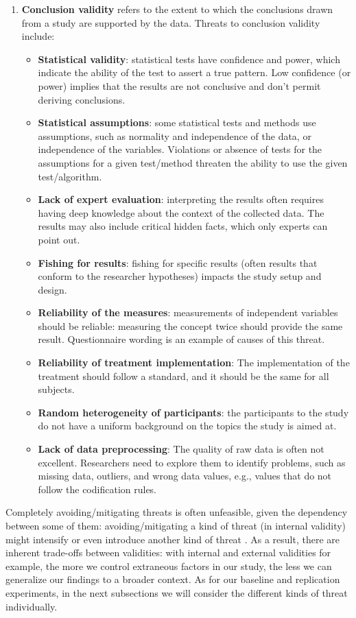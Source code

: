 \begin{enumerate}
    
    \item \textbf{Conclusion validity} refers to the extent to which the conclusions drawn from a study are supported by the data. 
    Threats to conclusion validity include:
    \begin{itemize}
        \item \textbf{Statistical validity}: statistical tests have confidence and power, which indicate the ability of the test to assert a true pattern. Low confidence (or power) implies that the results are not conclusive and don't permit deriving conclusions.
        \item \textbf{Statistical assumptions}: some statistical tests and methods use assumptions, such as normality and independence of the data, or independence of the variables. Violations or absence of tests for the assumptions for a given test/method threaten the ability to use the given test/algorithm.
        \item \textbf{Lack of expert evaluation}: interpreting the results often requires having deep knowledge about the context of the collected data. The results may also include critical hidden facts, which only experts can point out.
        \item \textbf{Fishing for results}: fishing for specific results (often results that conform to the researcher hypotheses) impacts the study setup and design. 
        \item \textbf{Reliability of the measures}: measurements of independent variables should be reliable: measuring the concept twice should provide the same result. Questionnaire wording is an example of causes of this threat.
        \item \textbf{Reliability of treatment implementation}: The implementation of the treatment should follow a standard, and it should be the same for all subjects.
        \item \textbf{Random heterogeneity of participants}: the participants to the study do not have a uniform background on the topics the study is aimed at.
        \item \textbf{Lack of data preprocessing}: The quality of raw data is often not excellent. Researchers need to explore them to identify problems, such as missing data, outliers, and wrong data values, e.g., values that do not follow the codification rules.
    \end{itemize}
\end{enumerate}

Completely avoiding/mitigating threats is often unfeasible, given the dependency between some of them: avoiding/mitigating a kind of threat (\ie in internal validity) might intensify or even introduce another kind of threat \cite{DBLP:books/sp/WohlinRHOR00}. As a result, there are inherent trade-offs between validities: with internal and external validities for example, the more we control extraneous factors in our study, the less we can generalize our findings to a broader context. As for our baseline and replication experiments, in the next subsections we will consider the different kinds of threat individually.

